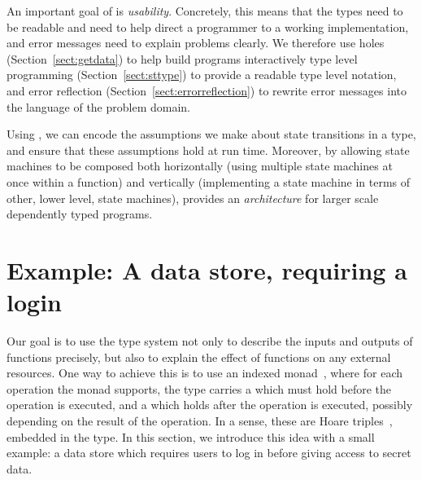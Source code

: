 An important goal of \states{} is \emph{usability}. Concretely, this means
that the types need to be readable and need to help direct a programmer to a
working implementation, and error messages need to explain problems clearly. 
We therefore use holes (Section~\ref{sect:getdata})
to help build programs interactively type level programming
(Section~\ref{sect:sttype}) to provide a readable type level notation, and
error reflection (Section~\ref{sect:errorreflection}) to rewrite error messages
into the language of the problem domain.

Using \states{}, we can encode the assumptions we make about state transitions
in a type, and ensure that these assumptions hold at
run time. Moreover, by allowing state machines to be composed both horizontally
(using multiple state machines at once within a function) and vertically
(implementing a state machine in terms of other, lower level, state machines),
\states{} provides an \emph{architecture} for larger scale dependently typed
programs.




\section{Example: A data store, requiring a login}

Our goal is to use the type system not only to describe the inputs
and outputs of functions precisely, but also to explain the effect of
functions on any external resources. 
One way to achieve this is to use an indexed monad~\citep{atkey-param},
where for each operation the monad supports, the type carries a
 which must hold before the operation is executed,
and a  which holds after the operation is executed,
possibly depending on the result of the operation. In a sense, these
are Hoare triples~\citep{hoarelogic}, embedded in the type.
%
In this section, we introduce this idea with a small example: a data store which requires users
to log in before giving access to secret data. 

